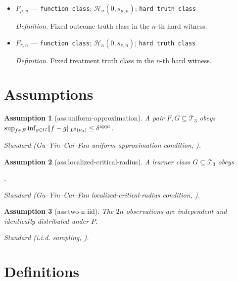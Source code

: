 \documentclass{article}
\newtheorem{assumption}{Assumption}
\begin{document}
\begin{itemize}
  \item \(F_{\mu,n}\) --- \texttt{function class}; \(\mathcal H_n(0,s_{\mu,n})\); \texttt{hard truth class}
  \par\smallskip\noindent\emph{Definition.} Fixed outcome truth class in the \(n\)-th hard witness.
  \item \(F_{\pi,n}\) --- \texttt{function class}; \(\mathcal H_n(0,s_{\pi,n})\); \texttt{hard truth class}
  \par\smallskip\noindent\emph{Definition.} Fixed treatment truth class in the \(n\)-th hard witness.
\end{itemize}

\section{Assumptions}

\begin{assumption}[ass:uniform-approximation]\label{ass:uniform-approximation}
A pair \(F,G\subseteq\mathcal T_3\) obeys \(\sup_{f\in F}\inf_{g\in G}\lVert f-g\rVert_{L^2(\nu_d)}\le\delta^{\rm appr}\).
\par\smallskip\noindent\emph{Standard} (Gu--Yin--Cai--Fan uniform approximation condition, \cite{gu2026optimally}).
\end{assumption}

\begin{assumption}[ass:localized-critical-radius]\label{ass:localized-critical-radius}
A learner class \(G\subseteq\mathcal T_3\) obeys \par\noindent {}\par\noindent.
\par\smallskip\noindent\emph{Standard} (Gu--Yin--Cai--Fan localized-critical-radius condition, \cite{gu2026optimally}).
\end{assumption}

\begin{assumption}[ass:two-n-iid]\label{ass:two-n-iid}
The \(2n\) observations are independent and identically distributed under \(P\).
\par\smallskip\noindent\emph{Standard} (i.i.d. sampling, \cite{gu2026optimally}).
\end{assumption}

\section{Definitions}
\end{document}
